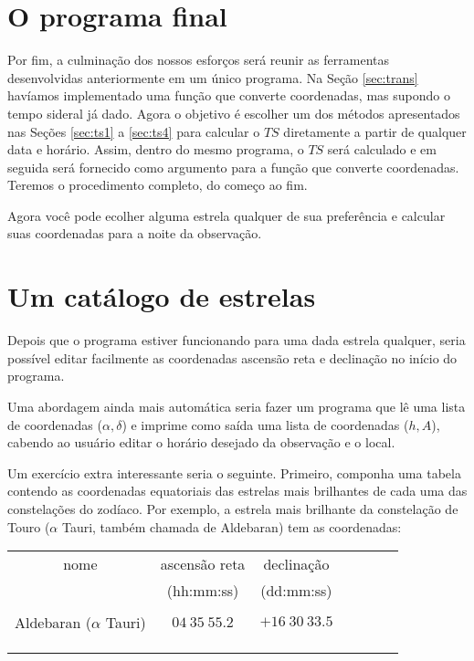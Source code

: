 \section{O programa final}

Por fim, a culminação dos nossos esforços será reunir as ferramentas desenvolvidas anteriormente em um único programa. Na Seção \ref{sec:trans} havíamos implementado uma função que converte coordenadas, mas supondo o tempo sideral já dado. Agora o objetivo é escolher um dos métodos apresentados nas Seções \ref{sec:ts1} a \ref{sec:ts4} para calcular o $TS$ diretamente a partir de qualquer data e horário. Assim, dentro do mesmo programa, o $TS$ será calculado e em seguida será fornecido como argumento para a função que converte coordenadas. Teremos o procedimento completo, do começo ao fim.

Agora você pode ecolher alguma estrela qualquer de sua preferência e calcular suas coordenadas para a noite da observação.

\section{Um catálogo de estrelas}

Depois que o programa estiver funcionando para uma dada estrela qualquer, seria possível editar facilmente as coordenadas ascensão reta e declinação no início do programa.

Uma abordagem ainda mais automática seria fazer um programa que lê uma lista de coordenadas ($\alpha, \delta$) e imprime como saída uma lista de coordenadas ($h, A$), cabendo ao usuário editar o horário desejado da observação e o local.

Um exercício extra interessante seria o seguinte. Primeiro, componha uma tabela contendo as coordenadas equatoriais das estrelas mais brilhantes de cada uma das constelações do zodíaco. Por exemplo, a estrela mais brilhante da constelação de Touro ($\alpha$ Tauri, também chamada de Aldebaran) tem as coordenadas:

\begin{center}
\begin{tabular}{ccccccc}
\hline
nome & ascensão reta & declinação  \\
& (hh:mm:ss) & (dd:mm:ss) \\

\hline
&&\\
Aldebaran ($\alpha$ Tauri) & $04~35~55.2$ & $+16~30~33.5$ \\
&&\\
&&\\
&&\\
\hline
\end{tabular}
\end{center}

